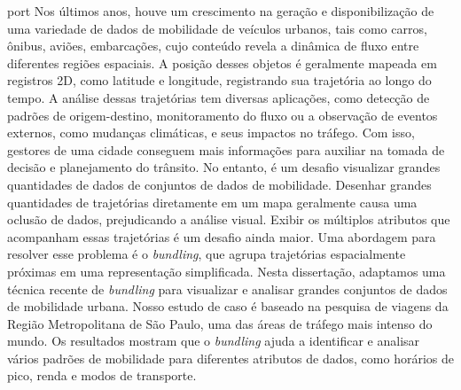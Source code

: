
\begin{resumo}{port}
  Nos últimos anos, houve um crescimento na geração e disponibilização de uma
variedade de dados de mobilidade de veículos urbanos, tais como carros, ônibus,
aviões, embarcações, cujo conteúdo revela a dinâmica de fluxo entre diferentes
regiões espaciais. A posição desses objetos é geralmente mapeada em registros
2D, como latitude e longitude, registrando sua trajetória ao longo do tempo. A
análise dessas trajetórias tem diversas aplicações, como detecção de padrões de
origem-destino, monitoramento do fluxo ou a observação de eventos externos, como
mudanças climáticas, e seus impactos no tráfego. Com isso, gestores de uma
cidade conseguem mais informações para auxiliar na tomada de decisão e
planejamento do trânsito. No entanto, é um desafio visualizar grandes
quantidades de dados de conjuntos de dados de mobilidade. Desenhar grandes
quantidades de trajetórias diretamente em um mapa geralmente causa uma  oclusão
de dados, prejudicando a análise visual. Exibir os múltiplos atributos que
acompanham essas trajetórias é um desafio ainda maior. Uma abordagem para
resolver esse problema é o \emph{bundling}, que agrupa trajetórias espacialmente
próximas em uma representação simplificada. Nesta dissertação, adaptamos uma
técnica recente de \emph{bundling} para visualizar e analisar grandes
conjuntos de dados de mobilidade urbana. Nosso estudo de caso é baseado na
pesquisa de viagens da Região Metropolitana de São Paulo, uma das áreas de
tráfego mais intenso do mundo. Os resultados mostram que o \emph{bundling} ajuda
a identificar e analisar vários padrões de mobilidade para diferentes atributos
de dados, como horários de pico, renda e modos de transporte.
\end{resumo}

